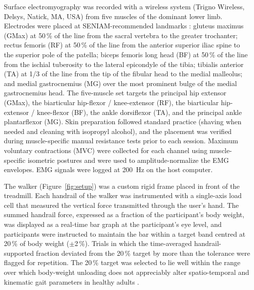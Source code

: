 \documentclass[11pt,a4paper]{article}
\begin{document}
Surface electromyography was recorded with a wireless system (Trigno Wireless, Delsys, Natick, MA, USA) from five muscles of the dominant lower limb. Electrodes were placed at SENIAM-recommended landmarks \citep{hermens2000}: gluteus maximus (GMax) at 50\,\% of the line from the sacral vertebra to the greater trochanter; rectus femoris (RF) at 50\,\% of the line from the anterior superior iliac spine to the superior pole of the patella; biceps femoris long head (BF) at 50\,\% of the line from the ischial tuberosity to the lateral epicondyle of the tibia; tibialis anterior (TA) at 1/3 of the line from the tip of the fibular head to the medial malleolus; and medial gastrocnemius (MG) over the most prominent bulge of the medial gastrocnemius head. The five-muscle set targets the principal hip extensor (GMax), the biarticular hip-flexor / knee-extensor (RF), the biarticular hip-extensor / knee-flexor (BF), the ankle dorsiflexor (TA), and the principal ankle plantarflexor (MG). Skin preparation followed standard practice (shaving when needed and cleaning with isopropyl alcohol), and the placement was verified during muscle-specific manual resistance tests prior to each session. Maximum voluntary contractions (MVC) were collected for each channel using muscle-specific isometric postures and were used to amplitude-normalize the EMG envelopes. EMG signals were logged at 200~Hz on the host computer.

The walker (Figure~\ref{fig:setup}) was a custom rigid frame placed in front of the treadmill. Each handrail of the walker was instrumented with a single-axis load cell that measured the vertical force transmitted through the user's hand. The summed handrail force, expressed as a fraction of the participant's body weight, was displayed as a real-time bar graph at the participant's eye level, and participants were instructed to maintain the bar within a target band centred at 20\,\% of body weight ($\pm$2\,\%). Trials in which the time-averaged handrail-supported fraction deviated from the 20\,\% target by more than the tolerance were flagged for repetition. The 20\,\% target was selected to lie well within the range over which body-weight unloading does not appreciably alter spatio-temporal and kinematic gait parameters in healthy adults \citep{apte2018,goldberg2013}.
\end{document}
